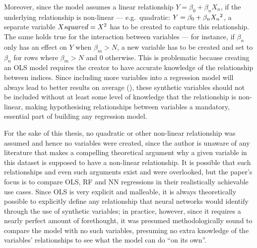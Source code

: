 \documentclass[12pt]{report}
\begin{document}
Moreover, since the model assumes a linear relationship \(Y=\beta_0+\beta_n X_n\), if the underlying relationship is non-linear --- e.g.\ quadratic: \(Y=\beta_0 + \beta_n X_n\textsuperscript{2}\), a separate variable \(Xsquared=X\textsuperscript{2}\) has to be created to capture this relationship. The same holds true for the interaction between variables --- for instance, if $\beta_n$ only has an effect on $Y$ when $\beta_m>N$, a new variable has to be created and set to $\beta_n$ for rows where $\beta_m>N$ and 0 otherwise. This is problematic because creating an OLS model requires the creator to have accurate knowledge of the relationship between indices. Since including more variables into a regression model will always lead to better results on average (\cite{Aoki2023}), these synthetic variables should not be included without at least some level of knowledge that the relationship is non-linear, making hypothesising relationships between variables a mandatory, essential part of building any regression model.

For the sake of this thesis, no quadratic or other non-linear relationship was assumed and hence no variables were created, since the author is unaware of any literature that makes a compelling theoretical argument why a given variable in this dataset is supposed to have a non-linear relationship. It is possible that such relationships and even such arguments exist and were overlooked, but the paper's focus is to compare OLS, RF and NN regressions in their realistically achievable use cases. Since OLS is very explicit and malleable, it is always theoretically possible to explicitly define any relationship that neural networks would identify through the use of synthetic variables; in practice, however, since it requires a nearly perfect amount of forethought, it was presumed methodologically sound to compare the model with no such variables, presuming no extra knowledge of the variables' relationships to see what the model can do ``on its own''.
\end{document}
